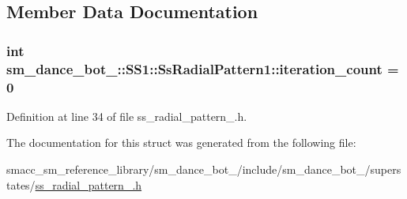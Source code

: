 \subsection{Member Data Documentation}
\subsubsection[{\texorpdfstring{iteration\+\_\+count}{iteration_count}}]{\setlength{\rightskip}{0pt plus 5cm}int sm\+\_\+dance\+\_\+bot\+\_\+::\+S\+S1\+::\+Ss\+Radial\+Pattern1\+::iteration\+\_\+count = 0}\hypertarget{structsm__dance__bot__3_1_1SS1_1_1SsRadialPattern1_a65f1fba9b7a18750484142c533514a70}{}\label{structsm__dance__bot__3_1_1SS1_1_1SsRadialPattern1_a65f1fba9b7a18750484142c533514a70}


Definition at line 34 of file ss\+\_\+radial\+\_\+pattern\+\_.\+h.



The documentation for this struct was generated from the following file\+:\begin{DoxyCompactItemize}
\item 
smacc\+\_\+sm\+\_\+reference\+\_\+library/sm\+\_\+dance\+\_\+bot\+\_/include/sm\+\_\+dance\+\_\+bot\+\_/superstates/\hyperlink{3_2include_2sm__dance__bot__3_2superstates_2ss__radial__pattern__1_8h}{ss\+\_\+radial\+\_\+pattern\+\_.\+h}\end{DoxyCompactItemize}
